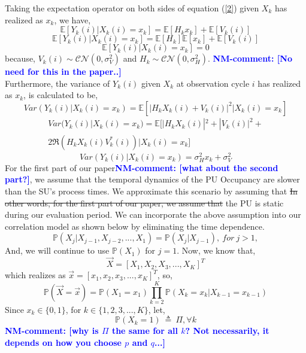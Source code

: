\documentclass[conference]{IEEEtran}
\newcommand{\nm}[1]{\textcolor{blue}{\textbf{NM-comment: [#1]}}}
\newcommand{\add}[1]{{\color{red}#1}}
\newcommand{\sst}[1]{\st{#1}}
\begin{document}
Taking the expectation operator on both sides of equation (\ref{2}) given $X_k$ has realized as $x_k$, we have,
\[\mathbb E[Y_k(i)|X_k(i)=x_k]=\mathbb E[H_kx_k]+\mathbb E[V_k(i)]\]
\[\mathbb E[Y_k(i)|X_k(i)=x_k]=\mathbb E[H_k]\mathbb E[x_k]+\mathbb E[V_k(i)]\]
\begin{equation}\label{4}
    \mathbb E[Y_k(i)|X_k(i)=x_k]=0
\end{equation}
because, $V_k(i)\sim\mathcal{CN}(0,\sigma_V^2)$ and $H_k\sim\mathcal{CN}(0,\sigma_H^2)$. 
\nm{No need for this in the paper..}
\\Furthermore, the variance of $Y_k(i)$ given $X_k$ at observation cycle $i$ has realized as $x_k$, is calculated to be, 
\begin{equation*}
    Var(Y_k(i)|X_k(i)=x_k)=\mathbb E[|H_kX_k(i)+V_k(i)|^2|X_k(i)=x_k]
\end{equation*}
\begin{equation*}
    \begin{aligned}
        Var(Y_k(i)|X_k(i)=x_k)=\mathbb E[|H_kX_k(i)|^2+|V_k(i)|^2+\\2\Re(H_kX_k(i)V_k^*(i))|X_k(i)=x_k]
    \end{aligned}
\end{equation*}
\begin{equation}\label{5}
    Var(Y_k(i)|X_k(i)=x_k)=\sigma_H^2x_k+\sigma_V^2
\end{equation}
For the first part of our paper\nm{what about the second part?}, we assume that the temporal dynamics of the PU Occupancy are slower than the SU's process times. 
\add{We approximate this scenario by assuming that}
\sst{In other words, for the first part of our paper, we assume that} the PU is static during our evaluation period. We can incorporate the above assumption into our correlation model as shown below by eliminating the time dependence.
\[\mathbb P(X_{j}|X_{j-1},X_{j-2},...,X_1)=\mathbb P(X_{j}|X_{j-1}),\ for\ j>1,\]
And, we will continue to use $\mathbb P(X_1)$ for $j=1$.
Now, we know that, 
\[\vec{X}=[X_1,X_2,X_3,...,X_K]^T\] 
which realizes as $\vec{x}=[x_1,x_2,x_3,...,x_K]^T$, so,
\begin{equation}\label{6}
    \mathbb P(\vec{X}=\vec{x})=\mathbb P(X_1=x_1) \prod_{k=2}^{K} \mathbb P(X_k=x_k|X_{k-1}=x_{k-1})
\end{equation}
Since $x_k \in \{0,1\}$, for $k \in \{1,2,3,...,K\}$, let,
\begin{equation*}
    \mathbb P(X_k=1)\ \triangleq\ \Pi, \forall k
\end{equation*}
\nm{why is $\Pi$ the same for all $k$? Not necessarily, it depends on how you choose $p$ and $q$...}
\end{document}

